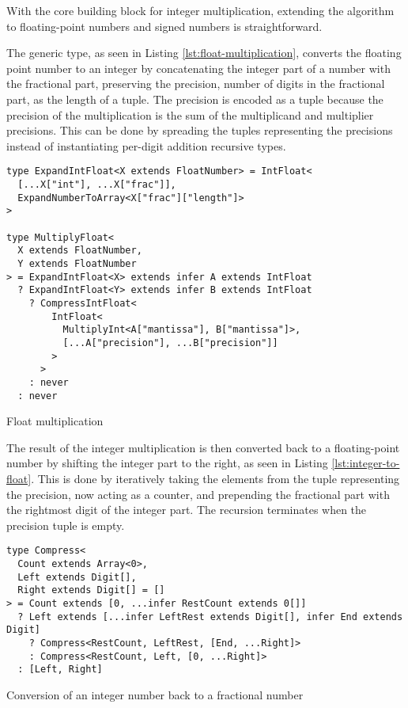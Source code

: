 With the core building block for integer multiplication, extending the algorithm to floating-point numbers and signed numbers is straightforward.

The  generic type, as seen in Listing \ref{lst:float-multiplication}, converts the floating point number to an integer by concatenating the integer part of a number with the fractional part, preserving the precision, number of digits in the fractional part, as the length of a tuple. The precision is encoded as a tuple because the precision of the multiplication is the sum of the multiplicand and multiplier precisions. This can be done by spreading the tuples representing the precisions instead of instantiating per-digit addition recursive types.

\clearpage

\begin{listing}[ht]
  \begin{verbatim}
type ExpandIntFloat<X extends FloatNumber> = IntFloat<
  [...X["int"], ...X["frac"]],
  ExpandNumberToArray<X["frac"]["length"]>
>

type MultiplyFloat<
  X extends FloatNumber,
  Y extends FloatNumber
> = ExpandIntFloat<X> extends infer A extends IntFloat
  ? ExpandIntFloat<Y> extends infer B extends IntFloat
    ? CompressIntFloat<
        IntFloat<
          MultiplyInt<A["mantissa"], B["mantissa"]>,
          [...A["precision"], ...B["precision"]]
        >
      >
    : never
  : never
\end{verbatim}
  \caption{Float multiplication}\label{lst:float-multiplication}
\end{listing}

The result of the integer multiplication is then converted back to a floating-point number by shifting the integer part to the right, as seen in Listing \ref{lst:integer-to-float}. This is done by iteratively taking the elements from the tuple representing the precision, now acting as a counter, and prepending the fractional part with the rightmost digit of the integer part. The recursion terminates when the precision tuple is empty.

\begin{listing}[ht]
  \begin{verbatim}
type Compress<
  Count extends Array<0>,
  Left extends Digit[],
  Right extends Digit[] = []
> = Count extends [0, ...infer RestCount extends 0[]]
  ? Left extends [...infer LeftRest extends Digit[], infer End extends Digit]
    ? Compress<RestCount, LeftRest, [End, ...Right]>
    : Compress<RestCount, Left, [0, ...Right]>
  : [Left, Right]
\end{verbatim}
  \caption{Conversion of an integer number back to a fractional number}\label{lst:integer-to-float}
\end{listing}
